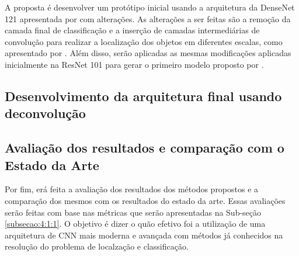 A proposta é desenvolver um protótipo inicial usando a arquitetura da \ac{DenseNet} 121 apresentada por  com alterações. As alterações a ser feitas são a remoção da camada final de classificação e a inserção de camadas intermediárias de convolução para realizar a localização dos objetos em diferentes escalas, como apresentado por . Além disso, serão aplicadas as mesmas modificações aplicadas inicialmente na \ac{ResNet} 101 para gerar o primeiro modelo proposto por \cite{cheng-2017}.

\subsection{Desenvolvimento da arquitetura final usando deconvolução}
\label{subsecao:4:1:4}


\subsection{Avaliação dos resultados e comparação com o Estado da Arte}
\label{subsecao:4:1:5}

Por fim, erá feita a avaliação dos resultados dos métodos propostos e a comparação dos mesmos com os resultados do estado da arte. Essas avaliações serão feitas com base nas métricas que serão apresentadas na Sub-seção \ref{subsecao:4:1:1}. O objetivo é dizer o quão efetivo foi a utilização de uma arquitetura de \ac{CNN} mais moderna e avançada com métodos já conhecidos na resolução do problema de localzação e classificação.




